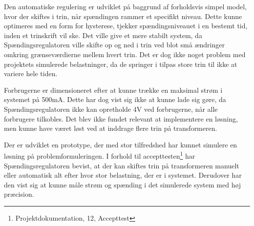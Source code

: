 
Den automatiske regulering er udviklet på baggrund af forholdsvis simpel model, hvor der skiftes i trin, når spændingen rammer et specifikt niveau. Dette kunne optimeres med en form for hysterese, tjekker spændingsniveauet i en bestemt tid, inden et trinskrift vil ske. Det ville give et mere stabilt system, da Spændingsregulatoren ville skifte op og ned i trin ved blot små ændringer omkring grænseværdierne mellem hvert trin. Det er dog ikke noget problem med projektets simulerede belastninger, da de springer i tilpas store trin til ikke at variere hele tiden.

Forbrugerne er dimensioneret efter at kunne trække en maksimal strøm i systemet på 500mA. Dette har dog vist sig ikke at kunne lade sig gøre, da Spændingsregulatoren ikke kan opretholde 4V ved forbrugerne, når alle forbrugere tilkobles. Det blev ikke fundet relevant at implementere en løsning, men kunne have været løst ved at inddrage flere trin på transformeren.

Der er udviklet en prototype, der med stor tilfredshed har kunnet simulere en løsning på problemformuleringen. I forhold til accepttesten\footnote{Projektdokumentation, 12, Accepttest} har Spændingsregulatoren bevist, at der kan skiftes trin på transformeren manuelt eller automatisk alt efter hvor stor belastning, der er i systemet. Derudover har den vist sig at kunne måle strøm og spænding i det simulerede system med høj præcision.